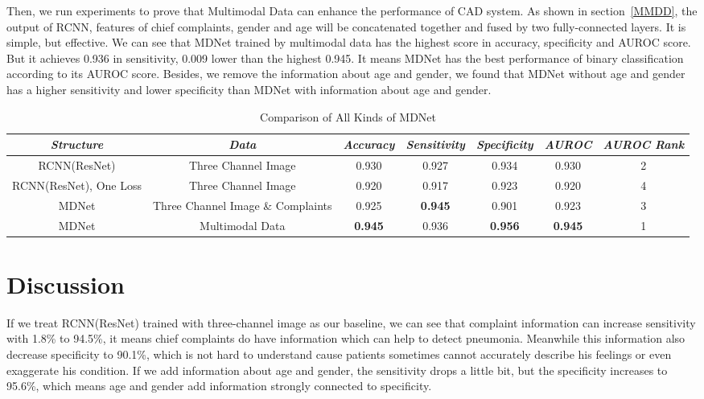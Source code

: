 \documentclass[journal]{IEEEtran}
\begin{document}
Then, we run experiments to prove that Multimodal Data can enhance the performance of CAD system. As shown in section~\ref{MMDD}, the output of RCNN, features of chief complaints, gender and age will be concatenated together and fused by two fully-connected layers. It is simple, but effective. We can see that MDNet trained by multimodal data has the highest score in accuracy, specificity and AUROC score. But it achieves 0.936 in sensitivity, 0.009 lower than the highest 0.945. It means MDNet has the best performance of binary classification according to its AUROC score. 
Besides, we remove the information about age and gender, we found that MDNet without age and gender has a higher sensitivity and lower specificity than MDNet with information about age and gender. 
\begin{table}[htb]
\vspace{-0cm}
\caption{Comparison of All Kinds of MDNet}
\vspace{-0cm}
\begin{center}
\begin{tabular}{|c|c|c|c|c|c|c|}
\hline
\textbf{\textit{Structure}} & \textbf{\textit{Data}}& \textbf{\textit{Accuracy}}  & \textbf{\textit{Sensitivity}} & \textbf{\textit{Specificity}} & \textbf{\textit{AUROC}}& \textbf{\textit{AUROC Rank}}\\
\hline
RCNN(ResNet) & Three Channel Image& 0.930 & 0.927 & 0.934 & 0.930 &2\\
RCNN(ResNet), One Loss & Three Channel Image& 0.920 & 0.917 & 0.923 & 0.920 &4\\
MDNet & Three Channel Image \& Complaints & 0.925 & {\bfseries 0.945} & 0.901 & 0.923 &3\\
MDNet & Multimodal Data&  {\bfseries 0.945} & 0.936 & {\bfseries 0.956} & {\bfseries 0.945} &1\\
\hline
\end{tabular}
\vspace{-0cm}
\label{comparison}
\end{center}
\vspace{-0cm}
\end{table}
    


\section{Discussion}
\label{discuss}
If we treat RCNN(ResNet) trained with three-channel image as our baseline, we can see that complaint information can increase sensitivity with 1.8\% to 94.5\%, it means chief complaints do have information which can help to detect pneumonia. Meanwhile this information also decrease specificity to 90.1\%, which is not hard to understand cause patients sometimes cannot accurately describe his feelings or even exaggerate his condition. If we add information about age and gender, the sensitivity drops a little bit, but the specificity increases to 95.6\%, which means age and gender add information strongly connected to specificity.
\end{document}
